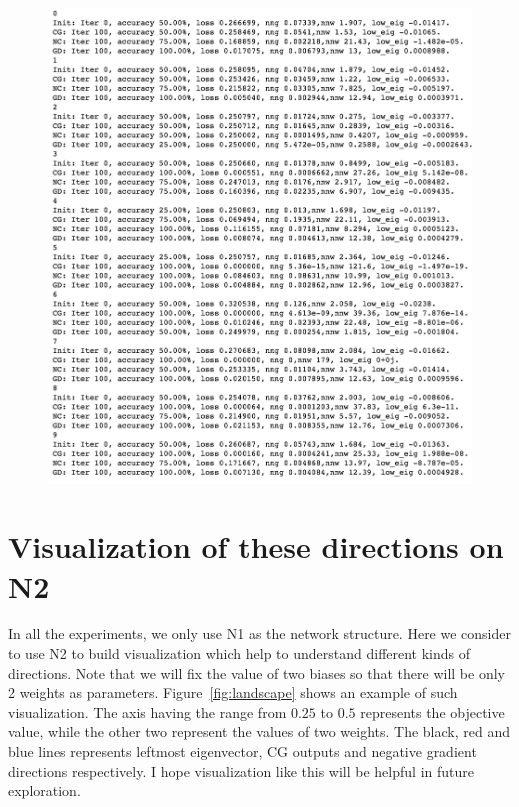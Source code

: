 \documentclass[12pt]{article}
\begin{document}
\begin{figure}[h]
\includegraphics[width=16cm]{threeM}
\caption{}
\label{fig:3m}
\end{figure}



\section{Visualization of these directions on N2}

In all the experiments, we only use N1 as the network structure. Here we consider to use N2 to build visualization which help to understand different kinds of directions. Note that we will fix the value of two biases so that there will be only 2 weights as parameters. Figure~\ref{fig:landscape} shows an example of such visualization. The axis having the range from $0.25$ to $0.5$ represents the objective value, while the other two represent the values of two weights. The black, red and blue lines represents leftmost eigenvector, CG outputs and negative gradient directions respectively. I hope visualization like this will be helpful in future exploration.  
\end{document}
